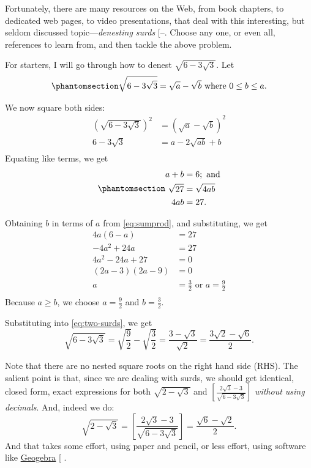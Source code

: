 \documentclass[
  a4paper,
]{article}
\begin{document}
Fortunately, there are many resources on the Web, from book chapters, to
dedicated web pages, to video presentations, that deal with this
interesting, but seldom discussed topic---\emph{denesting surds}
{[}--\citeproc{ref-ds-yt-method}{10}{]}.
Choose any one, or even all, references to learn from, and then tackle
the above problem.

For starters, I will go through how to denest \(\sqrt{6-3\sqrt{3}}\).
Let \begin{equation}\phantomsection\label{eq:two-surds}{
\sqrt{6-3\sqrt{3}} = \sqrt{a} - \sqrt{b} \mbox{ where } 0 \leq b \leq a.
}\end{equation}

We now square both sides: \[
\begin{aligned}
\left(\sqrt{6-3\sqrt{3}}\right)^2 &= \left(\sqrt{a} - \sqrt{b}\right)^2\\
6 - 3\sqrt{3} &= a - 2\sqrt{ab} + b\\
\end{aligned}
\] Equating like terms, we get
\begin{equation}\phantomsection\label{eq:sumprod}{
\begin{aligned}
a + b &= 6; \mbox{ and}\\
\sqrt{27} &= \sqrt{4ab}\\
4ab &= 27.
\end{aligned}
}\end{equation}

Obtaining \(b\) in terms of \(a\) from \cref{eq:sumprod}, and
substituting, we get \[
\begin{aligned}
4a(6-a) &= 27\\
-4a^2 + 24a &= 27\\
4a^2 -24a +27 &= 0\\
(2a - 3)(2a - 9) &=0\\
a &= \tfrac{3}{2} \mbox{ or } a = \tfrac{9}{2}\\
\end{aligned}
\] Because \(a \geq b\), we choose \(a = \frac{9}{2}\) and
\(b = \frac{3}{2}\).

Substituting into \cref{eq:two-surds}, we get \[
\sqrt{6-3\sqrt{3}} = \sqrt{\frac{9}{2}} - \sqrt{\frac{3}{2}} = \frac{3 - \sqrt{3}}{\sqrt{2}} = \frac{3\sqrt{2} - \sqrt{6}}{2}.
\]

Note that there are no nested square roots on the right hand side (RHS).
The salient point is that, since we are dealing with surds, we should
get identical, closed form, exact expressions for both
\(\sqrt{2 - \sqrt{3}}\) and
\(\left[\frac{2\sqrt{3} - 3}{\sqrt{6 - 3\sqrt{3}}}\right]\)
\emph{without using decimals}. And, indeed we do: \[
\sqrt{2 - \sqrt{3}} = \left[\frac{2\sqrt{3} - 3}{\sqrt{6 - 3\sqrt{3}}}\right] = \frac{\sqrt{6} - \sqrt{2}}{2}.
\] And that takes some effort, using paper and pencil, or less effort,
using software like \href{https://www.geogebra.org/}{Geogebra}
{[}\citeproc{ref-geogebra}{11}{]}  \normalfont.
\end{document}
